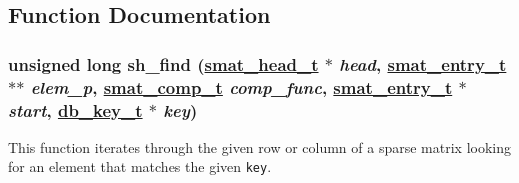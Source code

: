 \subsection{Function Documentation}
\hypertarget{group__dbprim__smat_a19}{
\subsubsection[sh\_\-find]{\setlength{\rightskip}{0pt plus 5cm}unsigned long sh\_\-find (\hyperlink{dbprim_8h_a1}{smat\_\-head\_\-t} $\ast$ {\em head}, \hyperlink{dbprim_8h_a2}{smat\_\-entry\_\-t} $\ast$$\ast$ {\em elem\_\-p}, \hyperlink{dbprim_8h_a5}{smat\_\-comp\_\-t} {\em comp\_\-func}, \hyperlink{dbprim_8h_a2}{smat\_\-entry\_\-t} $\ast$ {\em start}, \hyperlink{dbprim_8h_a0}{db\_\-key\_\-t} $\ast$ {\em key})}}
\label{group__dbprim__smat_a19}


This function iterates through the given row or column of a sparse matrix looking for an element that matches the given {\tt key}.

